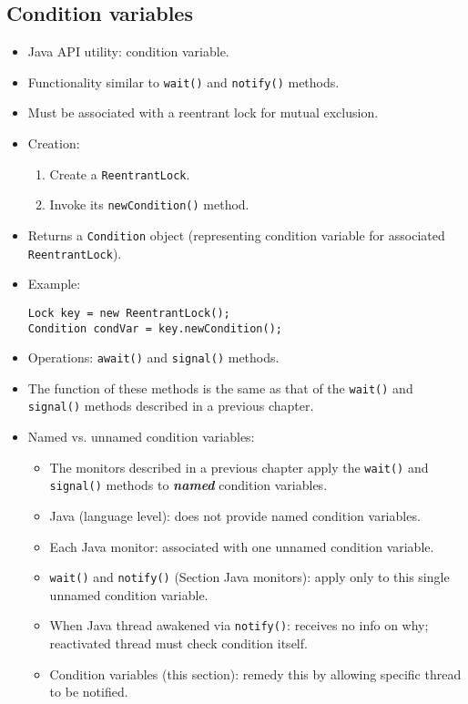 \subsection{Condition variables}
\begin{itemize}
    \item Java API utility: condition variable.
    \item Functionality similar to \texttt{wait()} and \texttt{notify()} methods.
    \item Must be associated with a reentrant lock for mutual exclusion.
    \item Creation:
    \begin{enumerate}
        \item Create a \texttt{ReentrantLock}.
        \item Invoke its \texttt{newCondition()} method.
    \end{enumerate}
    \item Returns a \texttt{Condition} object (representing condition variable for associated \texttt{ReentrantLock}).
    \item Example:
    \begin{verbatim}
Lock key = new ReentrantLock();
Condition condVar = key.newCondition();
    \end{verbatim}
    \item Operations: \texttt{await()} and \texttt{signal()} methods.
    \item The function of these methods is the same as that of the \texttt{wait()} and \texttt{signal()} methods described in a previous chapter.
    \item Named vs. unnamed condition variables:
    \begin{itemize}
        \item The monitors described in a previous chapter apply the \texttt{wait()} and \texttt{signal()} methods to \textbf{\textit{named}} condition variables.
        \item Java (language level): does not provide named condition variables.
        \item Each Java monitor: associated with one unnamed condition variable.
        \item \texttt{wait()} and \texttt{notify()} (Section Java monitors): apply only to this single unnamed condition variable.
        \item When Java thread awakened via \texttt{notify()}: receives no info on why; reactivated thread must check condition itself.
        \item Condition variables (this section): remedy this by allowing specific thread to be notified.

\end{itemize}
\end{itemize}

